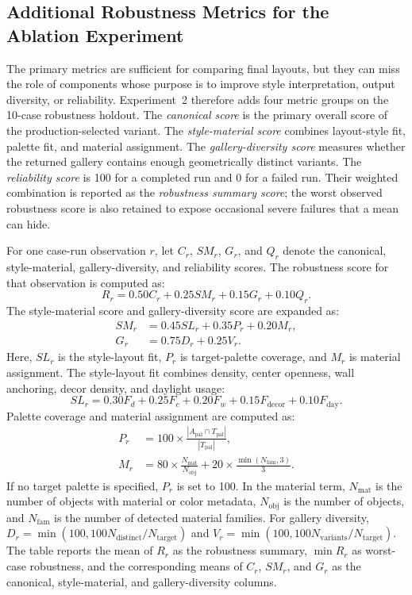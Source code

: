 \subsection{Additional Robustness Metrics for the Ablation Experiment}
The primary metrics are sufficient for comparing final layouts, but they can miss the role of components whose purpose is to improve style interpretation, output diversity, or reliability. Experiment~2 therefore adds four metric groups on the 10-case robustness holdout. The \emph{canonical score} is the primary overall score of the production-selected variant. The \emph{style-material score} combines layout-style fit, palette fit, and material assignment. The \emph{gallery-diversity score} measures whether the returned gallery contains enough geometrically distinct variants. The \emph{reliability score} is 100 for a completed run and 0 for a failed run. Their weighted combination is reported as the \emph{robustness summary score}; the worst observed robustness score is also retained to expose occasional severe failures that a mean can hide.

For one case-run observation \(r\), let \(C_r\), \(SM_r\), \(G_r\), and \(Q_r\) denote the canonical, style-material, gallery-diversity, and reliability scores. The robustness score for that observation is computed as:
\[
R_r = 0.50C_r + 0.25SM_r + 0.15G_r + 0.10Q_r.
\]
The style-material score and gallery-diversity score are expanded as:
\[
\begin{aligned}
SM_r &= 0.45SL_r + 0.35P_r + 0.20M_r,\\
G_r &= 0.75D_r + 0.25V_r.
\end{aligned}
\]
Here, \(SL_r\) is the style-layout fit, \(P_r\) is target-palette coverage, and \(M_r\) is material assignment. The style-layout fit combines density, center openness, wall anchoring, decor density, and daylight usage:
\[
SL_r = 0.30F_d + 0.25F_c + 0.20F_w + 0.15F_{\mathrm{decor}} + 0.10F_{\mathrm{day}}.
\]
Palette coverage and material assignment are computed as:
\[
\begin{aligned}
P_r &= 100 \times \frac{|A_{\mathrm{pal}} \cap T_{\mathrm{pal}}|}{|T_{\mathrm{pal}}|},\\
M_r &= 80 \times \frac{N_{\mathrm{mat}}}{N_{\mathrm{obj}}}
+20 \times \frac{\min(N_{\mathrm{fam}},3)}{3}.
\end{aligned}
\]
If no target palette is specified, \(P_r\) is set to 100. In the material term, \(N_{\mathrm{mat}}\) is the number of objects with material or color metadata, \(N_{\mathrm{obj}}\) is the number of objects, and \(N_{\mathrm{fam}}\) is the number of detected material families. For gallery diversity, \(D_r=\min(100,100N_{\mathrm{distinct}}/N_{\mathrm{target}})\) and \(V_r=\min(100,100N_{\mathrm{variants}}/N_{\mathrm{target}})\). The table reports the mean of \(R_r\) as the robustness summary, \(\min R_r\) as worst-case robustness, and the corresponding means of \(C_r\), \(SM_r\), and \(G_r\) as the canonical, style-material, and gallery-diversity columns.

